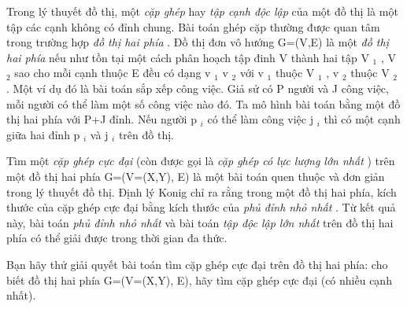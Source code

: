 Trong lý thuyết đồ thị, một   \textit{    cặp ghép   }   hay   \textit{    tập cạnh độc lập   }   của một đồ thị là một tập các cạnh không có đỉnh chung. Bài toán ghép   cặp thường được quan tâm trong trường hợp   \textit{    đồ thị hai phía   }   . Đồ thị đơn vô hướng G=(V,E) là một   \textit{    đồ thị hai phía   }   nếu như tồn tại một   cách phân hoạch tập đinh V thành hai tập V   $_    1   $   , V   $_    2   $   sao cho mỗi cạnh thuộc E đều có dạng v   $_    1   $   v   $_    2   $   với v   $_    1   $   thuộc V   $_    1   $   , v   $_    2   $   thuộc V   $_    2   $   . Một ví dụ đó là bài toán sắp xếp công việc. Giả sử có P người và   J công việc, mỗi người có thể làm một số công việc nào đó. Ta mô hình bài toán bằng một đồ thị hai phía với P+J đỉnh. Nếu người p   $_    i   $   có   thể làm công việc j   $_    i   $   thì có một cạnh giữa hai đỉnh p   $_    i   $   và j   $_    i   $   trên đồ thị.  

   Tìm một   \textit{    cặp ghép cực đại   }   (còn được gọi là   \textit{    cặp ghép có lực lượng lớn nhất   }   ) trên một đồ thị hai phía G=(V=(X,Y), E) là một bài   toán quen thuộc và đơn giản trong lý thuyết đồ thị. Định lý Konig chỉ ra rằng trong một đồ thị hai phía, kích thước của cặp ghép cực đại bằng kích thước   của   \textit{    phủ đỉnh nhỏ nhất   }   . Từ kết quả này, bài toán   \textit{    phủ đỉnh nhỏ nhất   }   và bài toán   \textit{    tập độc lập lớn nhất   }   trên đồ thị hai phía có thể giải   được trong thời gian đa thức.  

   Bạn hãy thử giải quyết bài toán tìm cặp ghép cực đại trên đồ thị hai phía: cho biết đồ thị hai phía G=(V=(X,Y), E), hãy tìm cặp ghép cực đại (có   nhiều cạnh nhất).  

\